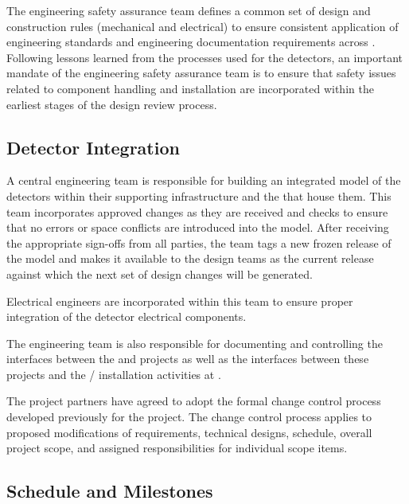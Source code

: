 The  engineering safety assurance team defines a common 
set of design and construction rules (mechanical and electrical) to 
ensure consistent application of engineering standards and engineering 
documentation requirements across .  
Following lessons learned from the processes used for the 
 detectors, an important mandate of the engineering 
safety assurance team is to ensure that safety issues related to 
component handling and installation are incorporated within the 
earliest stages of the design review process.  

\subsection{%
Detector Integration}   
\label{sec:dune_engineering}


A central  engineering team is responsible for building 
an integrated model of the detectors within their supporting
infrastructure and the  that house them.  %
This team incorporates approved changes as they 
are received and checks to ensure that no errors or space conflicts 
are introduced into the model.    After receiving the appropriate sign-offs from all 
parties, the %
team tags a new frozen release of the model 
and makes it available to the design teams as the current release 
against which the next set of design changes will be generated.

Electrical engineers are incorporated within %
this team to ensure proper integration of the detector electrical 
components. 

The  engineering team is also responsible for documenting and
controlling the interfaces between the  and  
projects as well as the interfaces between these projects and the 
/  installation activities at .  

The  project partners have agreed to adopt 
the formal change control process developed previously for the 
 project.  The change control process applies to 
proposed modifications of requirements, technical designs, 
schedule, overall project scope, and assigned responsibilities 
for individual scope items. 

\subsection{Schedule and Milestones}   %
\label{sec:dune_schedule}

